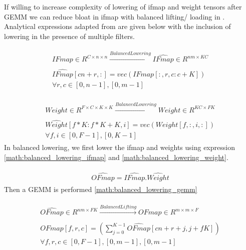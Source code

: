 If willing to increase complexity of lowering of ifmap and weight tensors after
GEMM we can reduce bloat in ifmap with balanced lifting/ loading in
\cite{cafe_con_troll}. Analytical expressions adapted from \cite{cafe_con_troll}
are given below with the inclusion of lowering in the presence of multiple
filters.


\clearpage

\begin{align}
    \begin{gathered}
        IFmap \in R^{C\times n\times n} \xrightarrow[]{Balanced Lowering} \hat{IFmap} \in R^{nm\times KC} \\
        \hat{IFmap}[cn+r, :] = vec(IFmap[:, r, c:c+K]) \\
        \forall r,c \in [0, n-1], [0, m-1]
    \end{gathered}
    \label{math:balanced_lowering_ifmap}
\end{align}

\begin{align}
    \begin{gathered}
        Weight \in R^{F\times C\times K \times K} \xrightarrow[]{Balanced Lowering} \hat{Weight} \in R^{KC\times FK}\\
        \hat{Weight}[f*K:f*K+K, i] = vec(Weight[f, :, i, :]) \\
        \forall f,i \in [0, F-1], [0, K-1]
    \end{gathered}
    \label{math:balanced_lowering_weight}
\end{align}
In balanced lowering, we first lower the ifmap and weights using expression 
\eqref{math:balanced_lowering_ifmap} and \eqref{math:balanced_lowering_weight}.

\begin{align}
    \begin{gathered}
        \hat{OFmap} = \hat{IFmap}.\hat{Weight}
    \end{gathered}
    \label{math:balanced_lowering_gemm}
\end{align}
Then a \ac{GEMM} is performed \eqref{math:balanced_lowering_gemm}


\begin{align}
    \begin{gathered}
        \hat{OFmap} \in R^{nm\times FK} \xrightarrow[]{Balanced Lifting} OFmap \in  R^{m\times m\times F}\\
        OFmap[f, r, c] = (\displaystyle\sum\limits_{j=0}^{K-1} \hat{OFmap}[cn+r+j, j+fK]) \\
        \forall f,r,c \in [0, F-1], [0, m-1], [0, m-1]
    \end{gathered}
    \label{math:balanced_lifting_ofmap}
\end{align}

